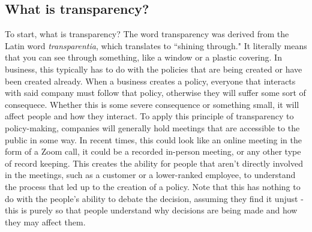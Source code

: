 \documentclass[12pt]{article}
\begin{document}
    \subsection{What is transparency?}
    To start, what is transparency? The word transparency was derived from the Latin word 
    \textit{transparentia}, which translates to ``shining through."
    It literally means that you can see through something, like a window or a plastic covering.
    In business, this typically has to do with the policies that are being created or have been
    created already. When a business creates a policy, everyone that interacts with said company
    must follow that policy, otherwise they will suffer some sort of consequece. Whether this is
    some severe consequence or something small, it will affect people and how they interact. To 
    apply this principle of transparency to policy-making, companies will generally hold meetings 
    that are accessible to the public in some way. In recent times, this could look like an online
    meeting in the form of a Zoom call, it could be a recorded in-person meeting, or any other type of
    record keeping. This creates the ability for people that aren't directly involved in the
    meetings, such as a customer or a lower-ranked employee, to understand the process that led 
    up to the creation of a policy. Note that this has nothing to do with the people's ability 
    to debate the decision, assuming they find it unjust - this is purely so that people 
    understand why decisions are being made and how they may affect them.
\end{document}
